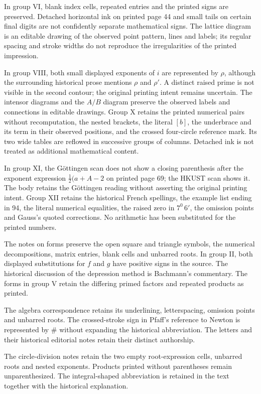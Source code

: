 In group VI, blank index cells, repeated entries and the printed signs are preserved. Detached horizontal ink on printed page 44 and small tails on certain final digits are not confidently separate mathematical signs. The lattice diagram is an editable drawing of the observed point pattern, lines and labels; its regular spacing and stroke widths do not reproduce the irregularities of the printed impression.

In group VIII, both small displayed exponents of $i$ are represented by $\rho$, although the surrounding historical prose mentions $\rho$ and $\rho'$. A distinct raised prime is not visible in the second contour; the original printing intent remains uncertain. The intensor diagrams and the $A/B$ diagram preserve the observed labels and connections in editable drawings. Group X retains the printed numerical pairs without recomputation, the nested brackets, the literal $[b]$, the underbrace and its term in their observed positions, and the crossed four-circle reference mark. Its two wide tables are reflowed in successive groups of columns. Detached ink is not treated as additional mathematical content.

In group XI, the Göttingen scan does not show a closing parenthesis after the exponent expression $\tfrac12(a+A-2$ on printed page 69; the HKUST scan shows it. The body retains the Göttingen reading without asserting the original printing intent. Group XII retains the historical French spellings, the example list ending in 94, the literal numerical equalities, the raised zero in $7^0\,6'$, the omission points and Gauss’s quoted corrections. No arithmetic has been substituted for the printed numbers.

The notes on forms preserve the open square and triangle symbols, the numerical decompositions, matrix entries, blank cells and unbarred roots. In group II, both displayed substitutions for $f$ and $g$ have positive signs in the source. The historical discussion of the depression method is Bachmann’s commentary. The forms in group V retain the differing primed factors and repeated products as printed.

The algebra correspondence retains its underlining, letterspacing, omission points and unbarred roots. The crossed-stroke sign in Pfaff’s reference to Newton is represented by \# without expanding the historical abbreviation. The letters and their historical editorial notes retain their distinct authorship.

The circle-division notes retain the two empty root-expression cells, unbarred roots and nested exponents. Products printed without parentheses remain unparenthesized. The integral-shaped abbreviation is retained in the text together with the historical explanation.

